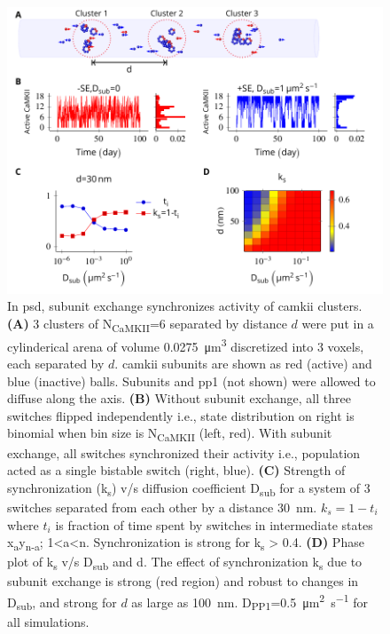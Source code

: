 \documentclass[9pt,lineno,doublespacing]{elife}
\newcommand\SUB[2]{#1\textsubscript{#2}}
\begin{document}
\begin{figure}%
    \includegraphics[width=0.9\linewidth]{./PaperFigures/elifeFigure5/figure_sync_150mm.pdf}
    \caption{In \gls{psd}, subunit exchange synchronizes activity of
        \gls{camkii} clusters. \textbf{(A)} 3 clusters of N\textsubscript{CaMKII}=6 
        separated by distance \(d\) were put in a cylinderical arena
        of volume \SI{0.0275}{\micro\meter^3} discretized into 3 voxels, each
        separated by \(d\). \Gls{camkii} subunits are shown as red (active) and
        blue (inactive) balls. Subunits and \gls{pp1} (not shown) were allowed to diffuse along
        the axis. \textbf{(B)} Without subunit exchange, all three switches
        flipped independently i.e., state distribution on right is binomial when bin size is \SUB{N}{CaMKII}
        (left, red). With subunit exchange, all switches synchronized their activity
        i.e., population acted as a single bistable switch (right, blue).  \textbf{(C)}
        Strength of synchronization (k\textsubscript{s}) v/s diffusion
        coefficient \SUB{D}{sub} for a system of 3 switches separated from each
        other by a distance \SI{30}{\nano \meter}.
        $k_s=1-t_i$ where $t_i$ is fraction of time
        spent by switches in intermediate states
        x\textsubscript{a}y\textsubscript{n-a}; 1\textless{}a\textless{}n.
        Synchronization is strong for k\textsubscript{s} \textgreater{} 0.4.
        \textbf{(D)} Phase plot of \SUB{k}{s} v/s \SUB{D}{sub} and d. The effect
        of synchronization \SUB{k}{s} due to subunit exchange is strong (red
        region) and robust to changes in \SUB{D}{sub}, and strong for $d$ as large as
        \SI{100}{\nano\meter}. \SUB{D}{PP1}=\SI{0.5}{\micro\meter\squared\per\second}
        for all simulations.}\label{fig:sync_spread}
\end{figure}
\end{document}
